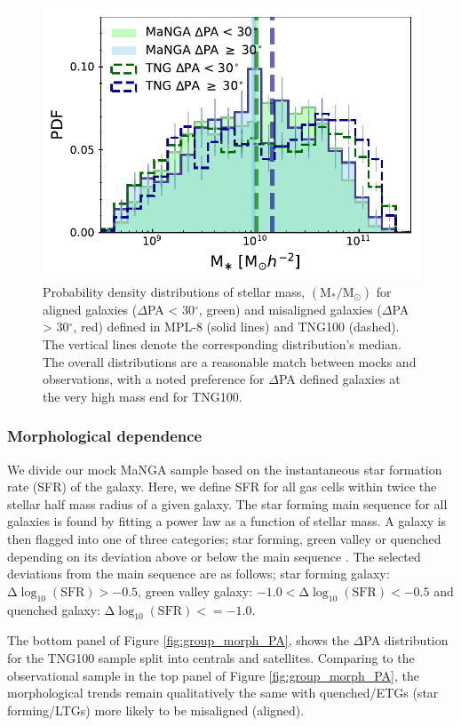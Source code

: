 \begin{figure}
    \centering
	\includegraphics[width=0.85\linewidth]{misalignment_TNG/delPA_split_stelM_tng_comparison.pdf}
    \caption{Probability density distributions of stellar mass, $\mathrm{(M_{\ast}/M_{\odot})}$ for aligned galaxies ($\Delta$PA < 30$^{\circ}$, green) and misaligned galaxies ($\Delta$PA > 30$^{\circ}$, red) defined in MPL-8 (solid lines) and TNG100 (dashed). The vertical lines denote the corresponding distribution's median. The overall distributions are a reasonable match between mocks and observations, with a noted preference for $\Delta$PA defined galaxies at the very high mass end for TNG100. }
    \label{fig:TNG_mpl8_stelM}
\end{figure}

\subsubsection{Morphological dependence} \label{sec:tng_morph}
We divide our mock MaNGA sample based on the instantaneous star formation rate (SFR) of the galaxy. Here, we define SFR for all gas cells within twice the stellar half mass radius of a given galaxy. The star forming main sequence for all galaxies is found by fitting a power law as a function of stellar mass. A galaxy is then flagged into one of three categories; star forming, green valley or quenched depending on its deviation above or below the main sequence \citep{pillepich2019}. The selected deviations from the main sequence are as follows; star forming galaxy: $\mathrm{\Delta \log_{10}(SFR) > −0.5}$, green valley galaxy: $\mathrm{-1.0 < \Delta \log_{10}(SFR) < -0.5}$ and quenched galaxy: $\mathrm{\Delta \log_{10}(SFR) <= -1.0}$.

The bottom panel of Figure \ref{fig:group_morph_PA}, shows the $\Delta$PA distribution for the TNG100 sample split into centrals and satellites. Comparing to the observational sample in the top panel of Figure \ref{fig:group_morph_PA}, the morphological trends remain qualitatively the same with quenched/ETGs (star forming/LTGs) more likely to be misaligned (aligned).

